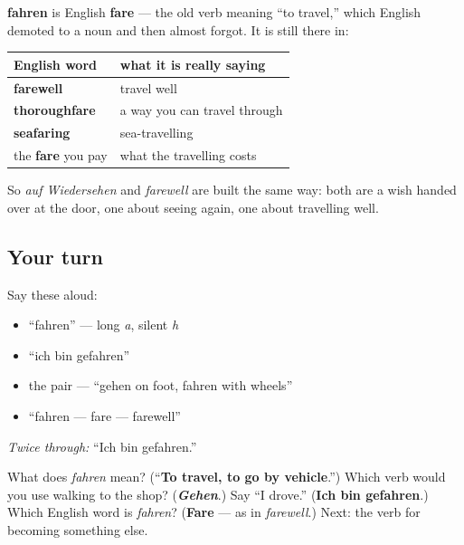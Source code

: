 \begin{cousinweb}
\textbf{fahren} is English \textbf{fare} — the old verb meaning \textquotedblleft{}to travel,\textquotedblright{} which English demoted to a noun and then almost forgot. It is still there in:

\noindent
\begin{tabularx}{\linewidth}{@{}>{\raggedright\arraybackslash}X>{\raggedright\arraybackslash}X@{}}
\toprule
\textbf{English word} & \textbf{what it is really saying} \\
\midrule
\textbf{farewell} & travel well \\
\textbf{thoroughfare} & a way you can travel through \\
\textbf{seafaring} & sea-travelling \\
the \textbf{fare} you pay & what the travelling costs \\
\bottomrule
\end{tabularx}

So \emph{auf Wiedersehen} and \emph{farewell} are built the same way: both are a wish handed over at the door, one about seeing again, one about travelling well.
\end{cousinweb}

\subsection*{Your turn}
Say these aloud:

\begin{itemize}
\raggedright
  \item \textquotedblleft{}fahren\textquotedblright{} — long \emph{a}, silent \emph{h}
  \item \textquotedblleft{}ich bin gefahren\textquotedblright{}
  \item the pair — \textquotedblleft{}gehen on foot, fahren with wheels\textquotedblright{}
  \item \textquotedblleft{}fahren — fare — farewell\textquotedblright{}
\end{itemize}

\emph{Twice through:} \textquotedblleft{}Ich bin gefahren.\textquotedblright{}

\begin{tcolorbox}[breakable,colback=teal!4,colframe=teal!35!black,title={Before you move on}]
What does \emph{fahren} mean? (\textquotedblleft{}\textbf{To travel, to go by vehicle}.\textquotedblright{}) Which verb would you use walking to the shop? (\emph{\textbf{Gehen}}.) Say \textquotedblleft{}I drove.\textquotedblright{} (\textbf{Ich bin gefahren}.) Which English word is \emph{fahren}? (\textbf{Fare} — as in \emph{farewell}.) Next: the verb for becoming something else.
\end{tcolorbox}
